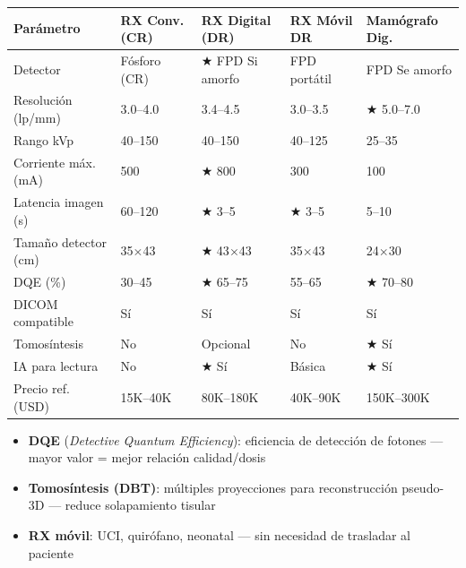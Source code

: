\documentclass[11pt, a4paper]{article}
\begin{document}
\begin{center}
\renewcommand{\arraystretch}{1.25}
\begin{tabular}{P{4.2cm} C{2.5cm} C{2.5cm} C{2.5cm} C{2.5cm}}
\toprule
{}
\textbf{\color{white}Parámetro} &
\textbf{\color{white}RX Conv. (CR)} &
\textbf{\color{white}RX Digital (DR)} &
\textbf{\color{white}RX Móvil DR} &
\textbf{\color{white}Mamógrafo Dig.} \\
\midrule
Detector                   & Fósforo (CR) & $\bigstar$ FPD Si amorfo & FPD portátil & FPD Se amorfo \\
Resolución (lp/mm)         & 3.0--4.0 & 3.4--4.5 & 3.0--3.5 & $\bigstar$ 5.0--7.0 \\
Rango kVp                  & 40--150 & 40--150 & 40--125 & 25--35 \\
Corriente máx. (mA)        & 500 & $\bigstar$ 800 & 300 & 100 \\
Latencia imagen (s)        & 60--120 & $\bigstar$ 3--5 & $\bigstar$ 3--5 & 5--10 \\
Tamaño detector (cm)       & 35$\times$43 & $\bigstar$ 43$\times$43 & 35$\times$43 & 24$\times$30 \\
DQE (\%)                   & 30--45 & $\bigstar$ 65--75 & 55--65 & $\bigstar$ 70--80 \\
DICOM compatible           & Sí & Sí & Sí & Sí \\
Tomosíntesis               & No & Opcional & No & $\bigstar$ Sí \\
IA para lectura            & No & $\bigstar$ Sí & Básica & $\bigstar$ Sí \\
Precio ref. (USD)          & 15K--40K & 80K--180K & 40K--90K & 150K--300K \\
\bottomrule
\end{tabular}
\end{center}

\begin{itemize}[leftmargin=*, itemsep=2pt, topsep=4pt]
  \footnotesize
  \item \textbf{DQE} (\textit{Detective Quantum Efficiency}): eficiencia de detección de fotones --- mayor valor = mejor relación calidad/dosis
  \item \textbf{Tomosíntesis (DBT)}: múltiples proyecciones para reconstrucción pseudo-3D --- reduce solapamiento tisular
  \item \textbf{RX móvil}: UCI, quirófano, neonatal --- sin necesidad de trasladar al paciente
\end{itemize}
\end{document}
